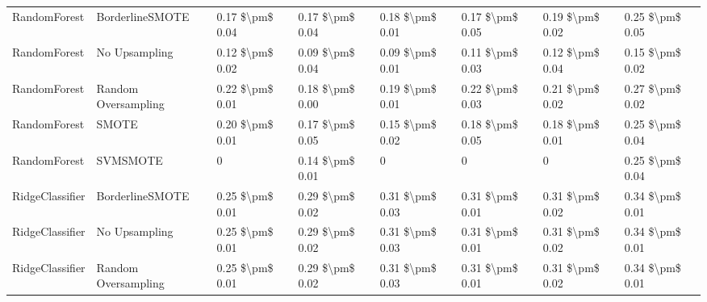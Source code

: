 \begin{tabular}{llllllll}
                   RandomForest &               BorderlineSMOTE & 0.17 \$\textbackslash pm\$ 0.04 &           0.17 \$\textbackslash pm\$ 0.04 &       0.18 \$\textbackslash pm\$ 0.01 &        0.17 \$\textbackslash pm\$ 0.05 &                         0.19 \$\textbackslash pm\$ 0.02 &     0.25 \$\textbackslash pm\$ 0.05 \\
                   RandomForest &                 No Upsampling & 0.12 \$\textbackslash pm\$ 0.02 &           0.09 \$\textbackslash pm\$ 0.04 &       0.09 \$\textbackslash pm\$ 0.01 &        0.11 \$\textbackslash pm\$ 0.03 &                         0.12 \$\textbackslash pm\$ 0.04 &     0.15 \$\textbackslash pm\$ 0.02 \\
                   RandomForest &           Random Oversampling & 0.22 \$\textbackslash pm\$ 0.01 &           0.18 \$\textbackslash pm\$ 0.00 &       0.19 \$\textbackslash pm\$ 0.01 &        0.22 \$\textbackslash pm\$ 0.03 &                         0.21 \$\textbackslash pm\$ 0.02 &     0.27 \$\textbackslash pm\$ 0.02 \\
                   RandomForest &                         SMOTE & 0.20 \$\textbackslash pm\$ 0.01 &           0.17 \$\textbackslash pm\$ 0.05 &       0.15 \$\textbackslash pm\$ 0.02 &        0.18 \$\textbackslash pm\$ 0.05 &                         0.18 \$\textbackslash pm\$ 0.01 &     0.25 \$\textbackslash pm\$ 0.04 \\
                   RandomForest &                      SVMSMOTE &               0 &           0.14 \$\textbackslash pm\$ 0.01 &                     0 &                      0 &                                       0 &     0.25 \$\textbackslash pm\$ 0.04 \\
                RidgeClassifier &               BorderlineSMOTE & 0.25 \$\textbackslash pm\$ 0.01 &           0.29 \$\textbackslash pm\$ 0.02 &       0.31 \$\textbackslash pm\$ 0.03 &        0.31 \$\textbackslash pm\$ 0.01 &                         0.31 \$\textbackslash pm\$ 0.02 &     0.34 \$\textbackslash pm\$ 0.01 \\
                RidgeClassifier &                 No Upsampling & 0.25 \$\textbackslash pm\$ 0.01 &           0.29 \$\textbackslash pm\$ 0.02 &       0.31 \$\textbackslash pm\$ 0.03 &        0.31 \$\textbackslash pm\$ 0.01 &                         0.31 \$\textbackslash pm\$ 0.02 &     0.34 \$\textbackslash pm\$ 0.01 \\
                RidgeClassifier &           Random Oversampling & 0.25 \$\textbackslash pm\$ 0.01 &           0.29 \$\textbackslash pm\$ 0.02 &       0.31 \$\textbackslash pm\$ 0.03 &        0.31 \$\textbackslash pm\$ 0.01 &                         0.31 \$\textbackslash pm\$ 0.02 &     0.34 \$\textbackslash pm\$ 0.01 \\

\end{tabular}
